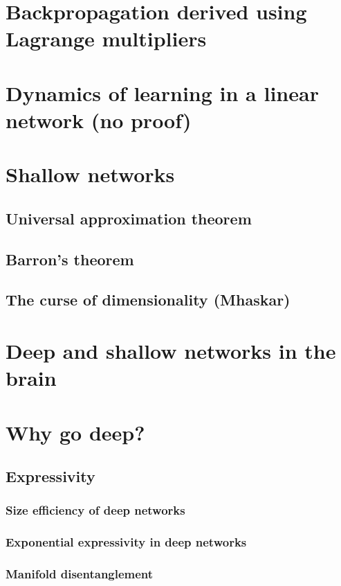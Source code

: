 \documentclass[11pt]{book} %
\begin{document}
\section{Backpropagation derived using Lagrange multipliers}

\section{Dynamics of learning in a linear network (no proof)}

\section{Shallow networks}
\subsection{Universal approximation theorem}
\subsection{Barron's theorem}
\subsection{The curse of dimensionality (Mhaskar)}

%
%
%

\section{Deep and shallow networks in the brain}

\section{Why go deep?}
\subsection{Expressivity}
\subsubsection{Size efficiency of deep networks}
\subsubsection{Exponential expressivity in deep networks}
\subsubsection{Manifold disentanglement}
\end{document}
